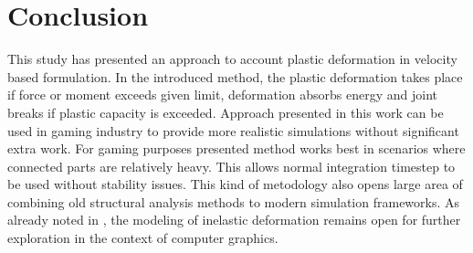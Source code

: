 \section{Conclusion}

This study has presented an approach to account plastic deformation in 
velocity based formulation.
In the introduced method, the plastic deformation takes place if force or moment exceeds given 
limit, deformation absorbs energy and joint breaks if plastic capacity is exceeded. 
Approach presented in this work can be used in gaming industry to provide more realistic 
simulations without significant extra work. For gaming purposes presented method works 
best in scenarios where connected parts are relatively heavy. This allows normal 
integration timestep to be used without stability issues. 
This kind of metodology also opens large area of combining old structural analysis
methods to modern simulation frameworks.
As already noted in \cite{cg1988}, the modeling of inelastic deformation
remains open for further exploration in the context of computer graphics.

